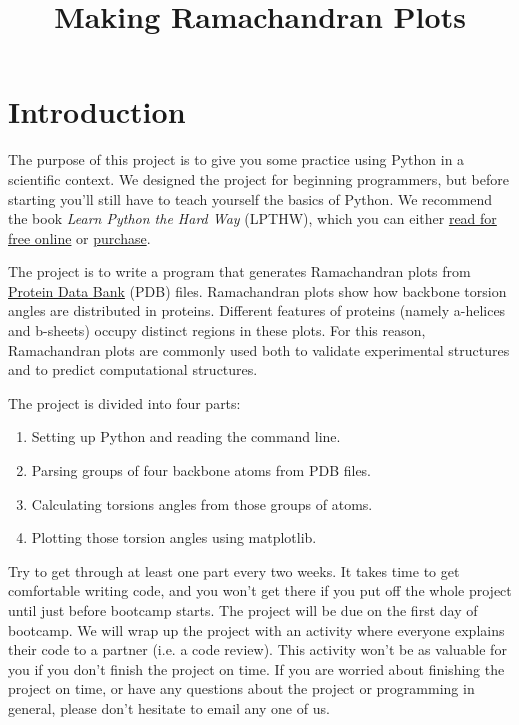 \documentclass{article}
\newcommand{\ahelices}{\textgreek{a}-helices}
\newcommand{\bsheets}{\textgreek{b}-sheets}
\begin{document}
\title{Making Ramachandran Plots}
\author{}
\date{}
\maketitle{}

\section{Introduction}

The purpose of this project is to give you some practice using Python in a 
scientific context.  We designed the project for beginning programmers, but 
before starting you'll still have to teach yourself the basics of Python.  We 
recommend the book \emph{Learn Python the Hard Way} (LPTHW), which you can 
either \href{http://learnpythonthehardway.org/book/}{read for free online} or 
\href{https://paydiv.io/access/buy/2/}{purchase}.

The project is to write a program that generates Ramachandran plots from 
\href{http://www.rcsb.org/pdb/home/home.do}{Protein Data Bank} (PDB) files.  
Ramachandran plots show how backbone torsion angles are distributed in 
proteins.  Different features of proteins (namely \ahelices{} and \bsheets{}) 
occupy distinct regions in these plots.  For this reason, Ramachandran plots 
are commonly used both to validate experimental structures and to predict 
computational structures.

The project is divided into four parts:

\begin{enumerate}
 \item Setting up Python and reading the command line.
 \item Parsing groups of four backbone atoms from PDB files.
 \item Calculating torsions angles from those groups of atoms.
 \item Plotting those torsion angles using matplotlib.
\end{enumerate}

Try to get through at least one part every two weeks.  It takes time to get 
comfortable writing code, and you won't get there if you put off the whole 
project until just before bootcamp starts.  The project will be due on the 
first day of bootcamp.  We will wrap up the project with an activity where 
everyone explains their code to a partner (i.e. a code review).  This activity 
won't be as valuable for you if you don't finish the project on time.  If you 
are worried about finishing the project on time, or have any questions about 
the project or programming in general, please don't hesitate to email any one 
of us.
\end{document}
